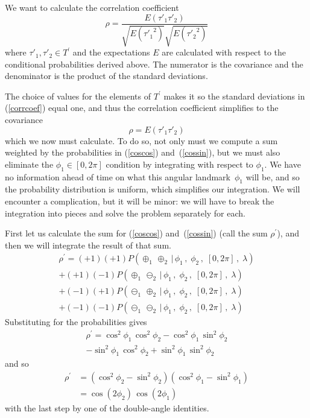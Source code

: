 \documentclass[9pt,technote]{IEEEtran}
\begin{document}
We want to calculate the correlation coefficient
\begin{equation}
  \label{corrcoef}
  \rho = \frac{E(\tau'_1 \tau'_2)}{\sqrt{E({\tau'_1}^2)}\sqrt{E({\tau'_2}^2)}}
\end{equation}
where $\tau'_1, \tau'_2 \in T^{\prime}$ and the expectations $E$ are
calculated with respect to the conditional probabilities derived
above. The numerator is the covariance and the denominator is the
product of the standard deviations.

The choice of values for the elements of $T^{\prime}$ makes it so the
standard deviations in (\ref{corrcoef}) equal one, and thus the
correlation coefficient simplifies to the covariance
\begin{equation}
  \rho = E(\tau'_1 \tau'_2)
\end{equation}
which we now must calculate. To do so, not only must we compute a sum
weighted by the probabilities in (\ref{coscos}) and~(\ref{cossin}),
but we must also eliminate the $\phi_1\in[0,2\pi]$ condition by
integrating with respect to $\phi_1$.  We have no information ahead of
time on what this angular landmark~$\phi_1$ will be, and so the
probability distribution is uniform, which simplifies our
integration. We will encounter a complication, but it will be minor:
we will have to break the integration into pieces and solve the
problem separately for each.

First let us calculate the sum for (\ref{coscos}) and~(\ref{cossin})
(call the sum $\rho^{\prime}$), and then we will integrate the result of that
sum.
\begin{multline}
  \rho^{\prime} 
  = (+1)(+1) P(\oplus_1\,\oplus_2\,|\,\phi_1\,,\; \phi_2\,,\; [0,2\pi]\,,\; \lambda) \\
  + (+1)(-1) P(\oplus_1\,\ominus_2\,|\,\phi_1\,,\; \phi_2\,,\; [0,2\pi]\,,\; \lambda) \\
  + (-1)(+1) P(\ominus_1\,\oplus_2\,|\,\phi_1\,,\; \phi_2\,,\; [0,2\pi]\,,\; \lambda) \\
  + (-1)(-1) P(\ominus_1\,\ominus_2\,|\,\phi_1\,,\; \phi_2\,,\; [0,2\pi]\,,\; \lambda)
\end{multline}
Substituting for the probabilities gives
\begin{multline}
  \rho^{\prime} = \cos^2 \phi_1\, \cos^2 \phi_2 - \cos^2 \phi_1\, \sin^2 \phi_2 \\
  - \sin^2 \phi_1\, \cos^2 \phi_2 + \sin^2 \phi_1\, \sin^2 \phi_2
\end{multline}
and so
\begin{align}
  \rho^{\prime} &= (\cos^2 \phi_2 - \sin^2 \phi_2) (\cos^2 \phi_1 - \sin^2 \phi_1) \\
                &=\cos(2\phi_2)\,\cos(2\phi_1)
\end{align}
with the last step by one of the double-angle identities.
\end{document}

